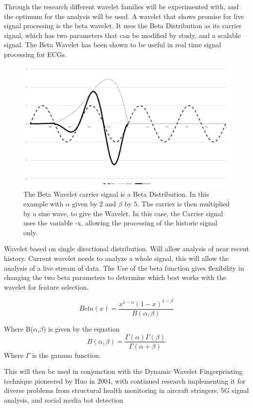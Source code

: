 \documentclass[journal=jacsat,manuscript=article]{achemso}
\begin{document}
Through the research different wavelet families will be experimented with, and the optimum for the analysis will be used.  A wavelet that shows promise for live signal processing is the beta wavelet.  It uses the Beta Distribution as its carrier signal, which has two parameters that can be modified by study, and a scalable signal.  The Beta Wavelet has been shown to be useful in real time signal processing for ECGs.  

\begin{figure}
	\centering
	\includegraphics[width=0.7\linewidth]{"Figures/Beta Wavelet"}
	\caption[Beta Wavelet]{The Beta Wavelet carrier signal is a Beta Distribution.  In this example with $\alpha$ given by 2 and $\beta$ by 5.  The carrier is then multiplied by a sine wave, to give the Wavelet.  In this case, the Carrier signal uses the variable -x, allowing the processing of the historic signal only.}
	\label{fig:beta_wavelet}
\end{figure}

Wavelet based on single directional distribution. Will allow analysis of near recent history. Current wavelet needs to analyze a whole signal, this will allow the analysis of a live stream of data.  The Use of the beta function gives flexibility in changing the two beta parameters to determine which best works with the wavelet for feature selection.

\begin{equation}
Beta(x) = \frac{x^{1-\alpha}(1-x)^{1-\beta}}{B(\alpha,\beta)}
\end{equation}

Where B($\alpha$,$\beta$) is given by the equation
\begin{equation}
B(\alpha,\beta) = \frac{\Gamma(\alpha)\Gamma(\beta)}{\Gamma(\alpha+\beta)}
\end{equation}
Where $\Gamma$ is the gamma function.

This will then be used in conjunction with the Dynamic Wavelet Fingerprinting technique pioneered by Huo in 2004, with continued research implementing it for diverse problems from structural health monitoring in aircraft stringers, 5G signal analysis, and social media bot detection
\end{document}
